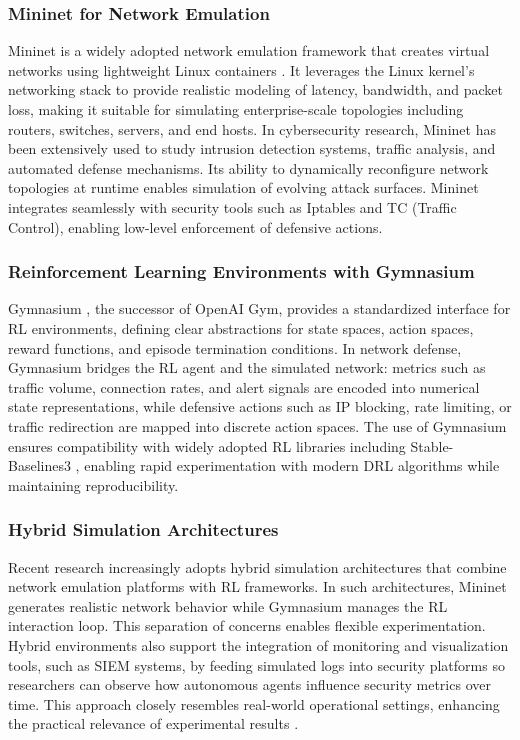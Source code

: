 \documentclass[conference]{IEEEtran}
\begin{document}
\subsubsection{Mininet for Network Emulation}
Mininet is a widely adopted network emulation framework that creates virtual
networks using lightweight Linux containers \cite{lantz2010mininet}. It
leverages the Linux kernel's networking stack to provide realistic modeling
of latency, bandwidth, and packet loss, making it suitable for simulating
enterprise-scale topologies including routers, switches, servers, and end
hosts. In cybersecurity research, Mininet has been extensively used to study
intrusion detection systems, traffic analysis, and automated defense
mechanisms. Its ability to dynamically reconfigure network topologies at
runtime enables simulation of evolving attack surfaces. Mininet integrates
seamlessly with security tools such as Iptables and TC (Traffic Control),
enabling low-level enforcement of defensive actions.

\subsubsection{Reinforcement Learning Environments with Gymnasium}
Gymnasium \cite{towers2023gymnasium}, the successor of OpenAI Gym, provides
a standardized interface for RL environments, defining clear abstractions
for state spaces, action spaces, reward functions, and episode termination
conditions. In network defense, Gymnasium bridges the RL agent and the
simulated network: metrics such as traffic volume, connection rates, and
alert signals are encoded into numerical state representations, while
defensive actions such as IP blocking, rate limiting, or traffic redirection
are mapped into discrete action spaces. The use of Gymnasium ensures
compatibility with widely adopted RL libraries including Stable-Baselines3
\cite{raffin2021sb3}, enabling rapid experimentation with modern DRL
algorithms while maintaining reproducibility.

\subsubsection{Hybrid Simulation Architectures}
Recent research increasingly adopts hybrid simulation architectures that
combine network emulation platforms with RL frameworks. In such
architectures, Mininet generates realistic network behavior while Gymnasium
manages the RL interaction loop. This separation of concerns enables
flexible experimentation. Hybrid environments also support the integration
of monitoring and visualization tools, such as SIEM systems, by feeding
simulated logs into security platforms so researchers can observe how
autonomous agents influence security metrics over time. This approach
closely resembles real-world operational settings, enhancing the practical
relevance of experimental results \cite{peuster2016containernet}.
\end{document}
